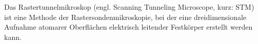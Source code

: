 Das Rastertunnelmikroskop (engl. Scanning Tunneling Microscope, kurz: STM) ist eine Methode der
Rastersondenmikroskopie, bei der eine dreidimensionale Aufnahme atomarer Oberflächen elektrisch
leitender Festkörper erstellt werden kann.
